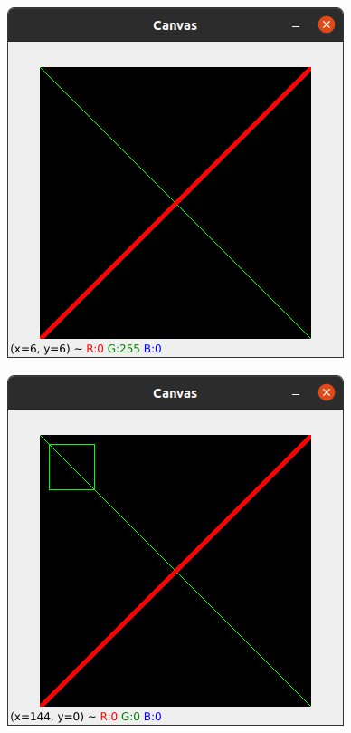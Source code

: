 \documentclass[12pt,letterpaper]{article}
\begin{document}
\begin{multicols}{2}
\begin{figure}[H]
\centering
\includegraphics[width = \columnwidth]{Resultado2_ch5.png}
\end{figure}

\begin{figure}[H]
\centering
\includegraphics[width = \columnwidth]{Resultado3_ch5.png}
\end{figure}


\end{multicols}
\end{document}
